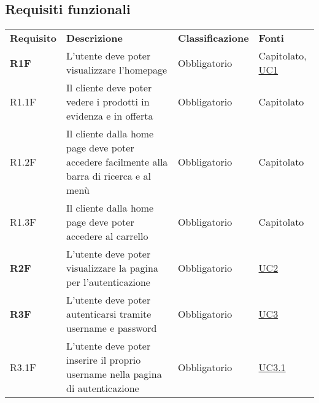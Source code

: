 \newpage
\subsection{Requisiti funzionali}
\begin{center}
    \centering
    \renewcommand{\arraystretch}{1.8}
    \label{tab:RequisitiFunzionali}
    \begin{longtable}[!h]{p{50px} p{210px} p{80px} p{50px}}
        \rowcolor{logo!70} \textbf{Requisito} & \textbf{Descrizione}                                                                                & \textbf{Classificazione} & \textbf{Fonti}                               \\
        \textbf{R1F}                          & L'utente deve poter visualizzare l'homepage                                                         & Obbligatorio             & Capitolato, \newline \hyperref[sec:UC1]{UC1} \\
        R1.1F                                 & Il cliente deve poter vedere i prodotti in evidenza e in offerta                                    & Obbligatorio             & Capitolato                                   \\
        R1.2F                                 & Il cliente dalla home page deve poter accedere facilmente alla barra di ricerca e al menù           & Obbligatorio             & Capitolato                                   \\
        R1.3F                                 & Il cliente dalla home page deve poter accedere al carrello                                          & Obbligatorio             & Capitolato                                   \\
        \textbf{R2F}                          & L'utente deve poter visualizzare la pagina per l'autenticazione                                     & Obbligatorio             & \hyperref[sec:UC2]{UC2}                      \\
        \textbf{R3F}                          & L'utente deve poter autenticarsi tramite username e password                                        & Obbligatorio             & \hyperref[sec:UC3]{UC3}                      \\
        R3.1F                                 & L'utente deve poter inserire il proprio username nella pagina di autenticazione                     & Obbligatorio             & \hyperref[sec:UC3.1]{UC3.1}                  \\

\end{longtable}
\end{center}
